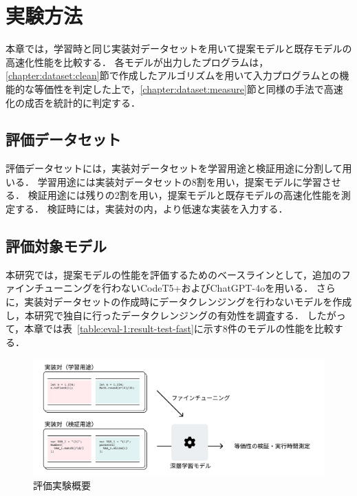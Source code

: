 \documentclass[11pt]{jreport}
\begin{document}


\section{実験方法}


本章では，学習時と同じ実装対データセットを用いて提案モデルと既存モデルの高速化性能を比較する．
各モデルが出力したプログラムは，\ref{chapter:dataset:clean}節で作成したアルゴリズムを用いて入力プログラムとの機能的な等価性を判定した上で，\ref{chapter:dataset:measure}節と同様の手法で高速化の成否を統計的に判定する．




\subsection{評価データセット}


評価データセットには，実装対データセットを学習用途と検証用途に分割して用いる．
学習用途には実装対データセットの8割を用い，提案モデルに学習させる．
検証用途には残りの2割を用い，提案モデルと既存モデルの高速化性能を測定する．
検証時には，実装対の内，より低速な実装を入力する．




\subsection{評価対象モデル}


本研究では，提案モデルの性能を評価するためのベースラインとして，追加のファインチューニングを行わないCodeT5+およびChatGPT-4oを用いる．
さらに，実装対データセットの作成時にデータクレンジングを行わないモデルを作成し，本研究で独自に行ったデータクレンジングの有効性を調査する．
したがって，本章では表~\ref{table:eval-1:result-test-fast}に示す8件のモデルの性能を比較する．


\begin{figure}[t]
\centerline{\includegraphics[width=0.8\linewidth]{Omori_fig/eval-1.pdf}}
\caption{評価実験概要}
\label{fig-dummy}
\end{figure}
\end{document}
